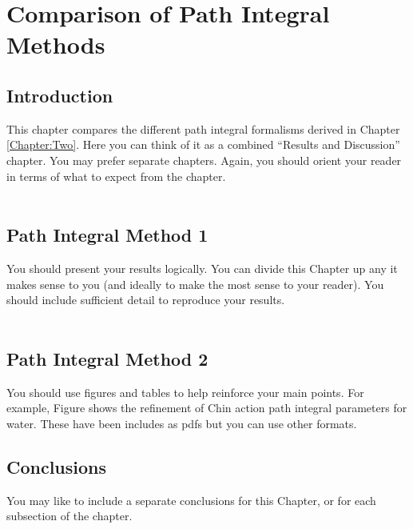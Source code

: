 \chapter{Comparison of Path Integral Methods}\label{Chapter:Three}
\section{Introduction}
This chapter compares the different path integral formalisms derived in 
Chapter \ref{Chapter:Two}. Here you can think of it as a combined ``Results 
and Discussion'' chapter. You may prefer separate chapters. Again, you should 
orient your reader in terms of what to expect from the chapter.
\\\\
\section{Path Integral Method 1}
You should present your results logically. You can divide this Chapter up any 
it makes sense to you (and ideally to make the  most sense to your reader). 
You should include sufficient detail to reproduce your results.
\\\\
\section{Path Integral Method 2}
You should use figures and tables to help reinforce your main points. For 
example, Figure  shows the refinement of Chin action 
path integral parameters for water. These have been includes as pdfs but you 
can use other formats.
\\

\section{Conclusions}
You may like to include a separate conclusions for this Chapter, or for each 
subsection of the chapter.

\newpage


